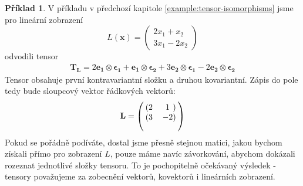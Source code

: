 \documentclass[a5paper,12pt]{amsbook}
\theoremstyle{definition}
\newtheorem{example}{Příklad}[chapter]
\newcommand{\myvec}[1]{\bm{#1}}
\newcommand{\mymatrix}[1]{\mathbf{#1}}
\begin{document}
\begin{example}

V příkladu v předchozí kapitole \ref{example:tensor-isomorphisms} jsme pro lineární zobrazení 
\begin{equation*}
L(\myvec{x}) = \left(
\begin{array}{c}
2 x_1 + x_2 \\
3x_1 - 2 x_2
\end{array}
\right)
\end{equation*}
odvodili tensor
\begin{equation*}
\begin{split}
\myvec{T_L}
= 2\myvec{e_1}\otimes\myvec{\epsilon_1}
+ \myvec{e_1}\otimes\myvec{\epsilon_2}
+ 3\myvec{e_2}\otimes\myvec{\epsilon_1}
- 2\myvec{e_2}\otimes\myvec{\epsilon_2}
\end{split}
\end{equation*}
Tensor obsahuje první kontravariantní složku a druhou kovariantní. Zápis do pole tedy bude sloupcový
vektor řádkových vektorů:
\begin{equation*}
\begin{split}
\mymatrix{L} =
\left(\begin{blockarray}{cc}
  \begin{block}{(cc)}
    2 & 1 \\
  \end{block}
  \begin{block}{(cc)}
    3 & -2 \\
  \end{block}
\end{blockarray}
\right)
\end{split}
\end{equation*}
Pokud se pořádně podíváte, dostal jsme přesně stejnou matici, jakou bychom získali přímo pro zobrazení
$L$, pouze máme navíc závorkování, abychom dokázali rozeznat jednotlivé složky tensoru. To je pochopitelně
očekávaný výsledek - tensory považujeme za zobecnění vektorů, kovektorů i lineárních zobrazení.


\end{example}
\end{document}
